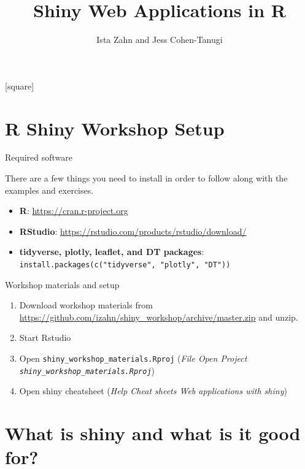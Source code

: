 \documentclass[
  12pt,
  ignorenonframetext,
]{beamer}
\title{Shiny Web Applications in R}
\author{Ista Zahn and Jess Cohen-Tanugi}
\date{}
\providecommand{\tightlist}{%
  \setlength{\itemsep}{0pt}\setlength{\parskip}{0pt}}
\begin{document}
\frame{\titlepage}

[square]

\begin{frame}
  \tableofcontents[hideallsubsections]
\end{frame}
\hypertarget{r-shiny-workshop-setup}{%
\section{R Shiny Workshop Setup}\label{r-shiny-workshop-setup}}

\begin{frame}[fragile]{Required software}
\protect\hypertarget{required-software}{}

There are a few things you need to install in order to follow along with
the examples and exercises.

\begin{itemize}
\tightlist
\item
  \textbf{R}: \url{https://cran.r-project.org}
\item
  \textbf{RStudio}: \url{https://rstudio.com/products/rstudio/download/}
\item
  \textbf{tidyverse, plotly, leaflet, and DT packages}:
  \newline \texttt{install.packages(c("tidyverse",\ "plotly",\ "DT"))}
\end{itemize}

\end{frame}

\begin{frame}[fragile]{Workshop materials and setup}
\protect\hypertarget{workshop-materials-and-setup}{}

\begin{enumerate}
\tightlist
\item
  Download workshop materials from
  \url{https://github.com/izahn/shiny_workshop/archive/master.zip} and
  unzip.
\item
  Start Rstudio
\item
  Open \texttt{shiny\_workshop\_materials.Rproj} (\emph{File
  \rightarrow Open Project
  \rightarrow \texttt{shiny\_workshop\_materials.Rproj}})
\item
  Open shiny cheatsheet (\emph{Help \rightarrow Cheat sheets
  \rightarrow Web applications with shiny})
\end{enumerate}

\end{frame}

\hypertarget{what-is-shiny-and-what-is-it-good-for}{%
\section{What is shiny and what is it good
for?}\label{what-is-shiny-and-what-is-it-good-for}}
\end{document}
